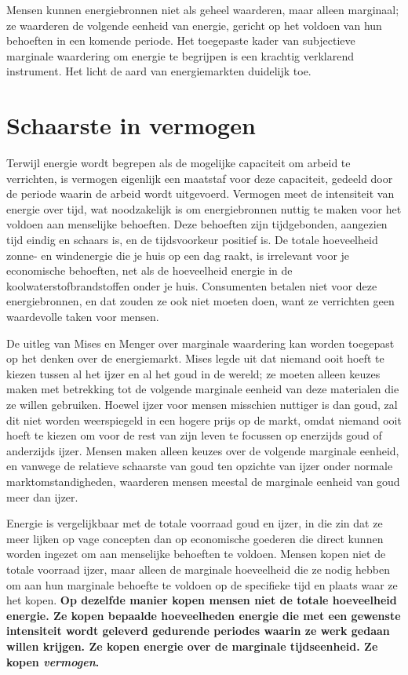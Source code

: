 \documentclass[
  a5paper,
  smalldemyvopaper,11pt,twoside,onecolumn,openright,extrafontsizes,
hidelinks]{memoir}
\begin{document}
Mensen kunnen energiebronnen niet als geheel waarderen, maar alleen
marginaal; ze waarderen de volgende eenheid van energie, gericht op het
voldoen van hun behoeften in een komende periode. Het toegepaste kader
van subjectieve marginale waardering om energie te begrijpen is een
krachtig verklarend instrument. Het licht de aard van energiemarkten
duidelijk toe.

\section{Schaarste in vermogen}\label{schaarste-in-vermogen}

Terwijl energie wordt begrepen als de mogelijke capaciteit om arbeid te
verrichten, is vermogen eigenlijk een maatstaf voor deze capaciteit,
gedeeld door de periode waarin de arbeid wordt uitgevoerd. Vermogen meet
de intensiteit van energie over tijd, wat noodzakelijk is om
energiebronnen nuttig te maken voor het voldoen aan menselijke
behoeften. Deze behoeften zijn tijdgebonden, aangezien tijd eindig en
schaars is, en de tijdsvoorkeur positief is. De totale hoeveelheid
zonne- en windenergie die je huis op een dag raakt, is irrelevant voor
je economische behoeften, net als de hoeveelheid energie in de
koolwaterstofbrandstoffen onder je huis. Consumenten betalen niet voor
deze energiebronnen, en dat zouden ze ook niet moeten doen, want ze
verrichten geen waardevolle taken voor mensen.

De uitleg van Mises en Menger over marginale waardering kan worden
toegepast op het denken over de energiemarkt. Mises legde uit dat
niemand ooit hoeft te kiezen tussen al het ijzer en al het goud in de
wereld; ze moeten alleen keuzes maken met betrekking tot de volgende
marginale eenheid van deze materialen die ze willen gebruiken. Hoewel
ijzer voor mensen misschien nuttiger is dan goud, zal dit niet worden
weerspiegeld in een hogere prijs op de markt, omdat niemand ooit hoeft
te kiezen om voor de rest van zijn leven te focussen op enerzijds goud
of anderzijds ijzer. Mensen maken alleen keuzes over de volgende
marginale eenheid, en vanwege de relatieve schaarste van goud ten
opzichte van ijzer onder normale marktomstandigheden, waarderen mensen
meestal de marginale eenheid van goud meer dan ijzer.

Energie is vergelijkbaar met de totale voorraad goud en ijzer, in die
zin dat ze meer lijken op vage concepten dan op economische goederen die
direct kunnen worden ingezet om aan menselijke behoeften te voldoen.
Mensen kopen niet de totale voorraad ijzer, maar alleen de marginale
hoeveelheid die ze nodig hebben om aan hun marginale behoefte te voldoen
op de specifieke tijd en plaats waar ze het kopen. \textbf{Op dezelfde
manier kopen mensen niet de totale hoeveelheid energie. Ze kopen
bepaalde hoeveelheden energie die met een gewenste intensiteit wordt
geleverd gedurende periodes waarin ze werk gedaan willen krijgen. Ze
kopen energie over de marginale tijdseenheid. Ze kopen \emph{vermogen}.}
\end{document}
